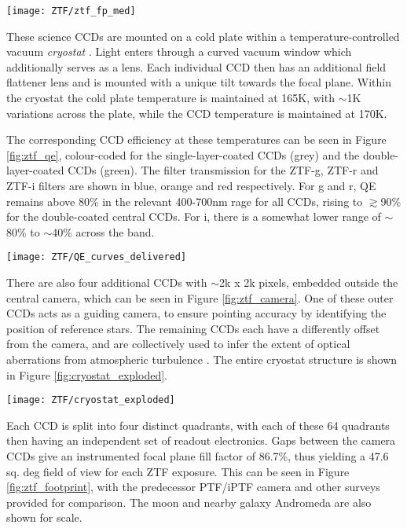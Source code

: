 \begin{marginfigure}
	\centering \texttt{[image: ZTF/ztf\_fp\_med]}
	\caption{An image of the ZTF camera, from \cite{ztf_system}.}
	\label{fig:ztf_camera}
\end{marginfigure}

These science CCDs are mounted on a cold plate within a temperature-controlled vacuum \emph{cryostat} \cite{ztf_obs_system}. Light enters through a curved vacuum window which additionally serves as a lens. Each individual CCD then has an additional field flattener lens and is mounted with a unique tilt towards the focal plane. Within the cryostat the cold plate temperature is maintained at 165K, with $\sim$1K variations across the plate, while the CCD temperature is maintained at 170K. 

The corresponding CCD efficiency at these temperatures can be seen in Figure \ref{fig:ztf_qe}, colour-coded for the single-layer-coated CCDs (grey) and the double-layer-coated CCDs (green). The filter transmission for the ZTF-g, ZTF-r and ZTF-i filters are shown in blue, orange and red respectively. For g and r, QE remains above 80\% in the relevant 400-700nm rage for all CCDs, rising to $\gtrsim$90\% for the double-coated central CCDs. For i, there is a somewhat lower range of $\sim$80\% to $\sim$40\% across the band.

\begin{marginfigure}
	\centering \texttt{[image: ZTF/QE\_curves\_delivered]}
	\caption{The quantum efficiency of ZTF CCDs, from \cite{ztf_system}.}
	\label{fig:ztf_qe}
\end{marginfigure}

There are also four additional CCDs with $\sim$2k x 2k pixels, embedded outside the central camera, which can be seen in Figure \ref{fig:ztf_camera}. One of these outer CCDs acts as a guiding camera, to ensure pointing accuracy by identifying the position of reference stars. The remaining CCDs each have a differently offset from the camera, and are collectively used to infer the extent of optical aberrations from atmospheric turbulence . The entire cryostat structure is shown in Figure \ref{fig:cryostat_exploded}.

\begin{figure*}
	\centering \texttt{[image: ZTF/cryostat\_exploded]}
	\caption{The ZTF cryostat design, from \cite{ztf_system}.}
	\label{fig:cryostat_exploded}
\end{figure*}

Each CCD is split into four distinct quadrants, with each of these 64 quadrants then having an independent set of readout electronics. Gaps between the camera CCDs give an instrumented focal plane fill factor of 86.7\%, thus yielding a 47.6 sq. deg field of view for each ZTF exposure. This can be seen in Figure \ref{fig:ztf_footprint}, with the predecessor PTF/iPTF camera and other surveys provided for comparison. The moon and nearby galaxy Andromeda are also shown for scale.

